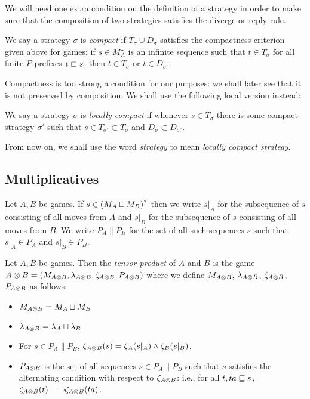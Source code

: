 \documentclass{article}
\begin{document}
We will need one extra condition on the definition of a strategy in order to make sure that the composition of two strategies satisfies the diverge-or-reply rule.

\begin{definition}
  We say a strategy $\sigma$ is \emph{compact} if $T_\sigma\cup D_\sigma$ satisfies the compactness criterion given above for games: if $s\in M_A^\omega$ is an infinite sequence such that $t\in T_\sigma$ for all finite $P$-prefixes $t\sqsubset s$, then $t\in T_\sigma$ or $t\in D_\sigma$.  
\end{definition}

Compactness is too strong a condition for our purposes: we shall later see that it is not preserved by composition.  We shall use the following local version instead:

\begin{definition}
  We say a strategy $\sigma$ is \emph{locally compact} if whenever $s\in T_\sigma$ there is some compact strategy $\sigma'$ such that $s\in T_{\sigma'}\subset T_\sigma$ and $D_\sigma\subset D_{\sigma'}$.
\end{definition}

From now on, we shall use the word \emph{strategy} to mean \emph{locally compact strategy}.

\subsection{Multiplicatives}

Let $A,B$ be games.  If $s\in {\overline{{(M_A\sqcup M_B)}^{*}}}$ then we write $s\vert_A$ for the subsequence of $s$ consisting of all moves from $A$ and $s\vert_B$ for the subsequence of $s$ consisting of all moves from $B$.  We write $P_A\|P_B$ for the set of all such sequences $s$ such that $s\vert_A\in P_A$ and $s\vert_B\in P_B$.  

\begin{definition}
  Let $A,B$ be games.  Then the \emph{tensor product} of $A$ and $B$ is the game $A\otimes B=(M_{A\otimes B}, \lambda_{A\otimes B}, \zeta_{A\otimes B}, P_{A\otimes B})$ where we define $M_{A\otimes B}$, $\lambda_{A\otimes B}$, $\zeta_{A\otimes B}$, $P_{A\otimes B}$ as follows:
  \begin{itemize}
    \item $M_{A\otimes B} = M_A \sqcup M_B$
    \item $\lambda_{A\otimes B} = \lambda_A \sqcup \lambda_B$
    \item For $s\in P_A\|P_B$, $\zeta_{A\otimes B}(s) = \zeta_A(s\vert_A) \wedge \zeta_B(s\vert_B)$.
    \item $P_{A\otimes B}$ is the set of all sequences $s\in P_A\|P_B$ such that $s$ satisfies the alternating condition with respect to $\zeta_{A\otimes B}$: i.e., for all $t,ta\sqsubseteq s$, $\zeta_{A\otimes B}(t) = \neg\zeta_{A\otimes B}(ta)$.  
  \end{itemize}
\end{definition}
\end{document}
